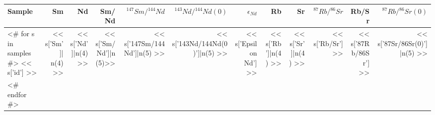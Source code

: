 \begin{tabular}{l r r r r r r r r r r r}
\hline
 Sample & Sm & Nd & Sm/Nd &
  ${^{147}Sm}/{^{144}Nd}$ &
  ${^{143}Nd}/{^{144}Nd}(0)$ &
  $\epsilon_{Nd}$ & Rb & Sr &
  ${^{87}Rb}/{^{86}Sr}$ & Rb/Sr&
  ${^{87}Rb}/{^{86}Sr}(0)$ \\
\hline
<# for s in samples  #>
  << s['id'] >> &
  << s['Sm']| n(4) >> &
  << s['Nd']|n(4) >> &
  << s['Sm/Nd']|n(5)>> &
  << s['147Sm/144Nd']|n(5) >> &
  << s['143Nd/144Nd(0)']|n(5) >> &
  << s['Epsilon Nd'] >> &
  << s['Rb']|n(4) >> &
  << s['Sr']|n(4) >> &
  << s['Rb/Sr'] >> &
  << s['87Rb/86Sr'] >> &
  << s['87Sr/86Sr(0)']|n(5) >> \\
<# endfor  #>

\hline
\end{tabular}


